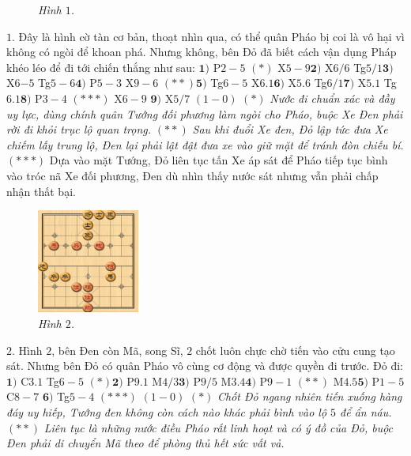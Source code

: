 \begin{multicols}{2}
\begin{figure}[H]
		\caption{\small\textit{\color{gocco}Hình $1$.}}
		\vspace*{-10pt}
	\end{figure}
	$1.$ Đây là hình cờ tàn cơ bản, thoạt nhìn qua, có thể quân Pháo bị coi là vô hại vì không có ngòi để khoan phá. Nhưng  không, bên Đỏ đã biết cách vận dụng Pháp khéo léo để đi tới chiến thắng như sau: 
	\vskip 0.05cm
	$\pmb{1)}$	P$2-5$ $(*)$ X$5-9$\quad $\pmb{2)}$ X$6/6$ Tg$5/1$\quad $\pmb{3)}$ X6$-5$ Tg$5-6$\quad $\pmb{4)}$ P$5-3$ X$9-6$ $(**)$\quad $\pmb{5)}$ Tg$6-5$ X$6.1$\quad $\pmb{6)}$ X$5.6$ Tg$6/1$\quad $\pmb{7)}$ X$5.1$ Tg$6.1$\quad $\pmb{8)}$ P$3-4$ $(***)$ X$6-9$ \quad$\pmb{9)}$ X$5/7$ $(1-0)$
	\vskip 0.05cm
	$(*)$ \textit{Nước đi chuẩn xác và đầy uy lực, dùng chính quân Tướng đối phương làm ngòi cho Pháo, buộc Xe Đen phải rời đi khỏi trục lộ quan trọng.}
	\vskip 0.05cm
	$(**)$ \textit{Sau khi đuổi Xe đen, Đỏ lập tức đưa Xe chiếm lấy trung lộ, Đen lại phải lật đật đưa xe vào giữ mặt để tránh đòn chiếu bí.}
	\vskip 0.05cm
	$(***)$ Dựa vào mặt Tướng, Đỏ liên tục tấn Xe áp sát để Pháo tiếp tục bình vào tróc nã Xe đối phương, Đen dù nhìn thấy nước sát nhưng vẫn phải chấp nhận thất bại.
	\begin{figure}[H]
		\vspace*{-5pt}
		\centering
		\captionsetup{labelformat= empty, justification=centering}
		\includegraphics[width= 0.3\textwidth]{1}
		\caption{\small\textit{\color{gocco}Hình $2$.}}
		\vspace*{-10pt}
	\end{figure}
	$2.$ Hình $2$, bên Đen còn Mã, song Sĩ, $2$ chốt luôn chực chờ tiến vào cửu cung tạo sát. Nhưng bên Đỏ có quân Pháo vô cùng cơ động và được quyền đi trước. Đỏ đi:
	\vskip 0.05cm
	$\pmb{1)}$ C$3.1$ Tg$6-5$ $(*)$\quad  $\pmb{2)}$ P$9.1$ M$4/3$\quad $\pmb{3)}$ P$9/5$ M$3.4$\quad $\pmb{4)}$ P$9-1$ $(**)$ M$4.5$\quad $\pmb{5)}$ P$1-5$ C$8-7$ \quad $\pmb{6)}$ Tg$5-4$ $(***)$ $(1-0)$
	\vskip 0.05cm
	$(*)$ \textit{Chốt Đỏ ngang nhiên tiến xuống hàng đáy uy hiếp, Tướng đen không còn cách nào khác phải bình vào lộ $5$ để ẩn náu.}
	\vskip 0.05cm
	$(**)$ \textit{Liên tục là những nước điều Pháo rất \linebreak linh hoạt và có ý đồ của Đỏ, buộc Đen phải di chuyển Mã theo để phòng thủ hết sức vất vả.}

\end{multicols}
